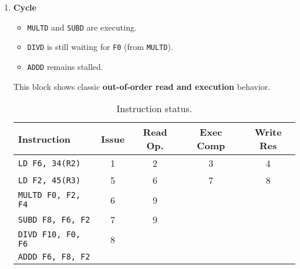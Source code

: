 \begin{enumerate}
    \newpage


    \item \textbf{Cycle \theenumi}
    \begin{itemize}
        \item \texttt{MULTD} and \texttt{SUBD} are executing.
        \item \texttt{DIVD} is still waiting for \texttt{F0} (from \texttt{MULTD}).
        \item \texttt{ADDD} remains stalled.
    \end{itemize}
    This block shows classic \textbf{out-of-order read and execution} behavior.

    \begin{table}[!htp]
        \centering
        \begin{tabular}{@{} l | c c c c @{}}
            \toprule
            Instruction                 & Issue & Read Op.  & Exec Comp & Write Res \\
            \midrule
            \texttt{LD    F6, 34(R2)}   & 1     & 2         & 3         & 4         \\ [.3em]
            \texttt{LD    F2, 45(R3)}   & 5     & 6         & 7         & 8         \\ [.3em]
            \texttt{MULTD F0, F2, F4}   & 6     & 9         &           &           \\ [.3em]
            \texttt{SUBD  F8, F6, F2}   & 7     & 9         &           &           \\ [.3em]
            \texttt{DIVD  F10, F0, F6}  & 8     &           &           &           \\ [.3em]
            \texttt{ADDD  F6, F8, F2}   &       &           &           &           \\
            \bottomrule
        \end{tabular}
        \caption*{Instruction status.}
    \end{table}


\end{enumerate}
